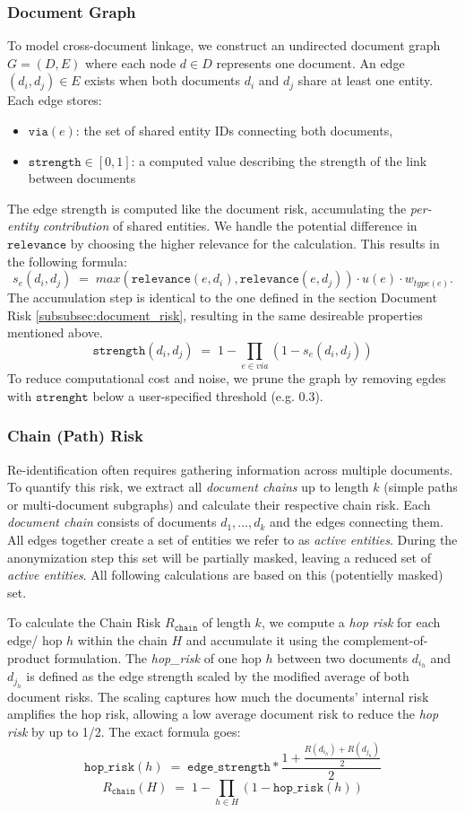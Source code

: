 \subsubsection{Document Graph}
To model cross-document linkage, we construct an undirected document graph $G=(D,E)$ where each node $d\in D$ represents one document. An edge $(d_i,d_j)\in E$ exists when both documents $d_i$ and $d_j$ share at least one entity. Each edge stores:
\begin{itemize}
\item $\texttt{via}(e)$: the set of shared entity IDs connecting both documents,
\item $\texttt{strength}\in[0,1]$: a computed value describing the strength of the link between documents
\end{itemize}
The edge strength is computed like the document risk, accumulating the \textit{per-entity contribution} of shared entities. We handle the potential difference in $\texttt{relevance}$ by choosing the higher relevance for the calculation. This results in the following formula:
\[
s_e(d_i, d_j) \; =\; max(\texttt{relevance}(e,d_i), \texttt{relevance}(e,d_j)) \cdot u(e) \cdot w_{type(e)}.
\]
The accumulation step is identical to the one defined in the section Document Risk \ref{subsubsec:document_risk}, resulting in the same desireable properties mentioned above.
\[
\texttt{strength}(d_i,d_j) \;=\; 1 - \prod_{e\in{via}}(1 - s_e(d_i,d_j))
\]
To reduce computational cost and noise, we prune the graph by removing egdes with $\texttt{strenght}$ below a user-specified threshold (e.g. $0.3$).
\subsubsection{Chain (Path) Risk}\label{subsubsec:chain_risk}
Re-identification often requires gathering information across multiple documents. To quantify this risk, we extract all \textit{document chains} up to length $k$ (simple paths or multi-document subgraphs) and calculate their respective chain risk. Each \textit{document chain} consists of documents $d_1,\dots,d_k$ and the edges connecting them. All edges together create a set of entities we refer to as \textit{active entities}. During the anonymization step this set will be partially masked, leaving a reduced set of \textit{active entities}. All following calculations are based on this (potentielly masked) set.

To calculate the Chain Risk $R_{\texttt{chain}}$ of length $k$, we compute a \emph{hop risk} for each edge/ hop $h$ within the chain $H$ and accumulate it using the complement-of-product formulation. The \textit{hop\_risk} of one hop $h$ between two documents $d_{i_h}$ and $d_{j_h}$ is defined as the edge strength scaled by the modified average of both document risks. The scaling captures how much the documents' internal risk amplifies the hop risk, allowing a low average document risk to reduce the \emph{hop risk} by up to 1/2. The exact formula goes:
\[
\texttt{hop\_risk}(h)\;=\; \texttt{edge\_strength} * \frac{1+\frac{R(d_{i_h}) + R(d_{j_h})}{2}}{2}
\]
\[
R_{\texttt{chain}}(H) \;=\; 1 - \prod_{h\in H} (1 - \texttt{hop\_risk}(h))
\]


